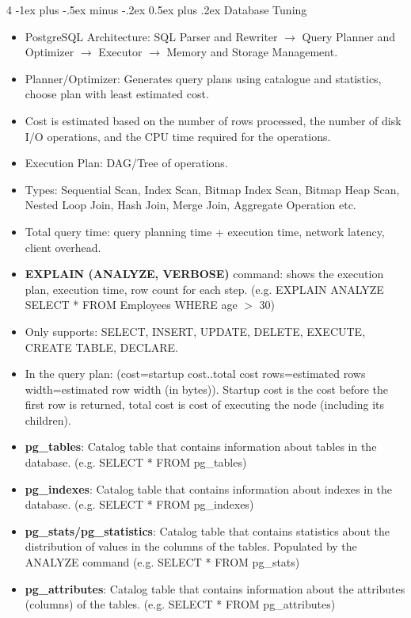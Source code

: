 \documentclass[10pt, landscape]{article}
\makeatletter
\renewcommand{\section}{\@startsection{section}{1}{0mm}%
  {-1ex plus -.5ex minus -.2ex}%
  {0.5ex plus .2ex}%
{\normalfont\large\bfseries}}
\makeatother
\begin{document}
\begin{multicols*}{4}
  \section{Database Tuning}
  \begin{itemize}
    \item PostgreSQL Architecture: SQL Parser and Rewriter $\rightarrow$ Query Planner and Optimizer $\rightarrow$ Executor $\rightarrow$ Memory and Storage Management.
    \item Planner/Optimizer: Generates query plans using catalogue and statistics, choose plan with least estimated cost.
    \item Cost is estimated based on the number of rows processed, the number of disk I/O operations, and the CPU time required for the operations.
    \item Execution Plan: DAG/Tree of operations. 
    \item Types: Sequential Scan, Index Scan, Bitmap Index Scan, Bitmap Heap Scan, Nested Loop Join, Hash Join, Merge Join, Aggregate Operation etc.
    \item Total query time: query planning time + execution time, network latency, client overhead.
    \item \textbf{EXPLAIN (ANALYZE, VERBOSE)} command: shows the execution plan, execution time, row count for each step. (e.g. EXPLAIN ANALYZE SELECT * FROM Employees WHERE age $>$ 30)
    \item Only supports: SELECT, INSERT, UPDATE, DELETE, EXECUTE, CREATE TABLE, DECLARE.
    \item In the query plan: (cost=startup cost..total cost rows=estimated rows width=estimated row width (in bytes)). Startup cost is the cost before the first row is returned, total cost is cost of executing the node (including its children).
    \item \textbf{pg\_tables}: Catalog table that contains information about tables in the database. (e.g. SELECT * FROM pg\_tables)
    \item \textbf{pg\_indexes}: Catalog table that contains information about indexes in the database. (e.g. SELECT * FROM pg\_indexes)
    \item \textbf{pg\_stats/pg\_statistics}: Catalog table that contains statistics about the distribution of values in the columns of the tables. Populated by the ANALYZE command (e.g. SELECT * FROM pg\_stats)
    \item \textbf{pg\_attributes}: Catalog table that contains information about the attributes (columns) of the tables. (e.g. SELECT * FROM pg\_attributes)

\end{itemize}
\end{multicols*}
\end{document}
